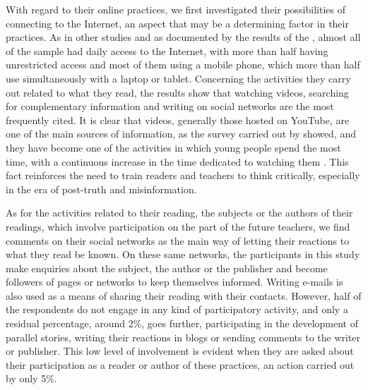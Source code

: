 \documentclass[english]{textolivre}
\begin{document}
With regard to their online practices, we first investigated their possibilities of connecting to the Internet, an aspect that may be a determining factor in their practices. As in other studies and as documented by the results of the \textcite{instituto_nacional_de_estadistica_ine_encuesta_2021}, almost all of the sample had daily access to the Internet, with more than half having unrestricted access and most of them using a mobile phone, which more than half use simultaneously with a laptop or tablet. Concerning the activities they carry out related to what they read, the results show that watching videos, searching for complementary information and writing on social networks are the most frequently cited. It is clear that videos, generally those hosted on YouTube, are one of the main sources of information, as the survey carried out by \textcite{castillo_rodriguez_habitos_2022} showed, and they have become one of the activities in which young people spend the most time, with a continuous increase in the time dedicated to watching them \cite{hernandez_ortega_nuevos_2021}. This fact reinforces the need to train readers and teachers to think critically, especially in the era of post-truth and misinformation. 

As for the activities related to their reading, the subjects or the authors of their readings, which involve participation on the part of the future teachers, we find comments on their social networks as the main way of letting their reactions to what they read be known. On these same networks, the participants in this study make enquiries about the subject, the author or the publisher and become followers of pages or networks to keep themselves informed. Writing e-mails is also used as a means of sharing their reading with their contacts. However, half of the respondents do not engage in any kind of participatory activity, and only a residual percentage, around 2\%, goes further, participating in the development of parallel stories, writing their reactions in blogs or sending comments to the writer or publisher. This low level of involvement is evident when they are asked about their participation as a reader or author of these practices, an action carried out by only 5\%.
\end{document}
